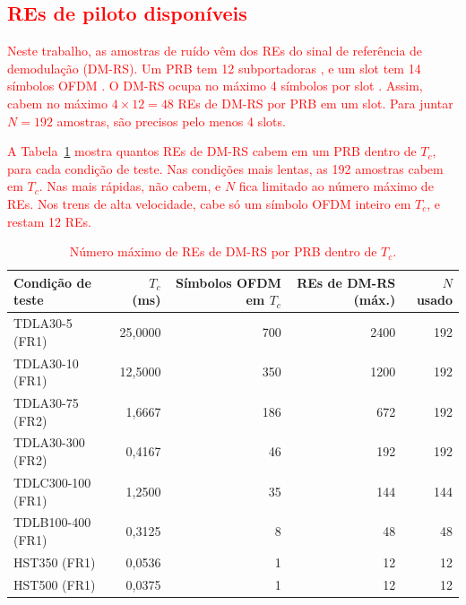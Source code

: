 \subsection{\texorpdfstring{\textcolor{red}{REs de piloto disponíveis}}{REs de piloto disponíveis}}\label{subsec:res-piloto}

\textcolor{red}{Neste trabalho, as amostras de ruído vêm dos REs do sinal de referência de demodulação (DM-RS). Um PRB tem 12 subportadoras \cite[Sec.~4.4.4.1]{3gpp-ts38211}, e um slot tem 14 símbolos OFDM \cite[Tab.~4.3.2-1]{3gpp-ts38211}. O DM-RS ocupa no máximo 4 símbolos por slot \cite[Tab.~6.4.1.1.3-3 e 6.4.1.1.3-4]{3gpp-ts38211}. Assim, cabem no máximo $4 \times 12 = 48$ REs de DM-RS por PRB em um slot. Para juntar $N = 192$ amostras, são precisos pelo menos 4 slots.}

\textcolor{red}{A Tabela~{\hypersetup{linkcolor=red}\ref{tab:n-maximo}} mostra quantos REs de DM-RS cabem em um PRB dentro de $T_c$, para cada condição de teste. Nas condições mais lentas, as 192 amostras cabem em $T_c$. Nas mais rápidas, não cabem, e $N$ fica limitado ao número máximo de REs. Nos trens de alta velocidade, cabe só um símbolo OFDM inteiro em $T_c$, e restam 12 REs.}

\begin{table}[htbp]
\caption{\textcolor{red}{Número máximo de REs de DM-RS por PRB dentro de $T_c$.}}
\label{tab:n-maximo}
\centering
\footnotesize
\renewcommand{\arraystretch}{1.2}
\begin{tabular}{|l|r|r|r|r|}
\hline
Condição de teste & $T_c$ (ms) & Símbolos OFDM em $T_c$ & REs de DM-RS (máx.) & $N$ usado \\
\hline
TDLA30-5 (FR1)    & 25,0000 & 700 & 2400 & 192 \\
TDLA30-10 (FR1)   & 12,5000 & 350 & 1200 & 192 \\
TDLA30-75 (FR2)   & 1,6667  & 186 & 672  & 192 \\
TDLA30-300 (FR2)  & 0,4167  & 46  & 192  & 192 \\
TDLC300-100 (FR1) & 1,2500  & 35  & 144  & 144 \\
TDLB100-400 (FR1) & 0,3125  & 8   & 48   & 48 \\
HST350 (FR1)      & 0,0536  & 1   & 12   & 12 \\
HST500 (FR1)      & 0,0375  & 1   & 12   & 12 \\
\hline
\end{tabular}
\end{table}

